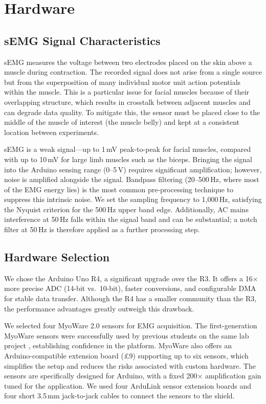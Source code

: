 \section{Hardware}
\label{sec:hardware}

\subsection{sEMG Signal Characteristics}

sEMG measures the voltage between two electrodes placed on the skin above a muscle during contraction. The recorded signal does not arise from a single source but from the superposition of many individual motor unit action potentials within the muscle. This is a particular issue for facial muscles because of their overlapping structure, which results in crosstalk between adjacent muscles and can degrade data quality. To mitigate this, the sensor must be placed close to the middle of the muscle of interest (the muscle belly) and kept at a consistent location between experiments.

sEMG is a weak signal---up to 1\,mV peak-to-peak for facial muscles, compared with up to 10\,mV for large limb muscles such as the biceps. Bringing the signal into the Arduino sensing range (0--5\,V) requires significant amplification; however, noise is amplified alongside the signal. Bandpass filtering (20--500\,Hz, where most of the EMG energy lies) is the most common pre-processing technique to suppress this intrinsic noise. We set the sampling frequency to 1,000\,Hz, satisfying the Nyquist criterion for the 500\,Hz upper band edge. Additionally, AC mains interference at 50\,Hz falls within the signal band and can be substantial; a notch filter at 50\,Hz is therefore applied as a further processing step.

\subsection{Hardware Selection}

We chose the Arduino Uno R4, a significant upgrade over the R3. It offers a 16$\times$ more precise ADC (14-bit vs.\ 10-bit), faster conversions, and configurable DMA for stable data transfer. Although the R4 has a smaller community than the R3, the performance advantages greatly outweigh this drawback.

We selected four MyoWare 2.0 sensors for EMG acquisition. The first-generation MyoWare sensors were successfully used by previous students on the same lab project \citep{sun2022}, establishing confidence in the platform. MyoWare also offers an Arduino-compatible extension board (\pounds9) supporting up to six sensors, which simplifies the setup and reduces the risks associated with custom hardware. The sensors are specifically designed for Arduino, with a fixed 200$\times$ amplification gain tuned for the application. We used four ArduLink sensor extension boards and four short 3.5\,mm jack-to-jack cables to connect the sensors to the shield.

